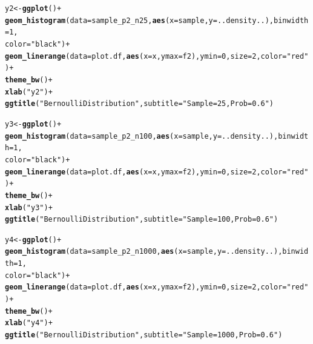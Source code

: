 \documentclass{article}\usepackage[]{graphicx}\usepackage[]{color}
\makeatletter
\newcommand{\hlnum}[1]{\textcolor[rgb]{0.686,0.059,0.569}{#1}}%
\newcommand{\hlstr}[1]{\textcolor[rgb]{0.192,0.494,0.8}{#1}}%
\newcommand{\hlopt}[1]{\textcolor[rgb]{0,0,0}{#1}}%
\newcommand{\hlstd}[1]{\textcolor[rgb]{0.345,0.345,0.345}{#1}}%
\newcommand{\hlkwb}[1]{\textcolor[rgb]{0.69,0.353,0.396}{#1}}%
\newcommand{\hlkwc}[1]{\textcolor[rgb]{0.333,0.667,0.333}{#1}}%
\newcommand{\hlkwd}[1]{\textcolor[rgb]{0.737,0.353,0.396}{\textbf{#1}}}%
\newenvironment{kframe}{%
 \def\at@end@of@kframe{}%
 \ifinner\ifhmode%
  \def\at@end@of@kframe{\end{minipage}}%
  \begin{minipage}{\columnwidth}%
 \fi\fi%
 \def\FrameCommand##1{\hskip\@totalleftmargin \hskip-\fboxsep
 \colorbox{shadecolor}{##1}\hskip-\fboxsep
     \hskip-\linewidth \hskip-\@totalleftmargin \hskip\columnwidth}%
 \MakeFramed {\advance\hsize-\width
   \@totalleftmargin\z@ \linewidth\hsize
   \@setminipage}}%
 {\par\unskip\endMakeFramed%
 \at@end@of@kframe}
\newenvironment{knitrout}{}{} %
\makeatother
\begin{document}
\begin{enumerate}
\begin{enumerate}
\begin{knitrout}
\begin{kframe}
\begin{alltt}
                \hlstd{y2}\hlkwb{<-}\hlkwd{ggplot}\hlstd{()}\hlopt{+}
          \hlkwd{geom_histogram}\hlstd{(}\hlkwc{data} \hlstd{= sample_p2_n25,} \hlkwd{aes}\hlstd{(}\hlkwc{x} \hlstd{= sample,} \hlkwc{y}\hlstd{=..density..),} \hlkwc{binwidth}\hlstd{=}\hlnum{1}\hlstd{,}
                         \hlkwc{color}\hlstd{=}\hlstr{"black"}\hlstd{)}\hlopt{+}
          \hlkwd{geom_linerange}\hlstd{(}\hlkwc{data}\hlstd{=plot.df,} \hlkwd{aes}\hlstd{(}\hlkwc{x}\hlstd{=x,} \hlkwc{ymax} \hlstd{= f2),} \hlkwc{ymin} \hlstd{=} \hlnum{0}\hlstd{,} \hlkwc{size}\hlstd{=}\hlnum{2}\hlstd{,} \hlkwc{color}\hlstd{=}\hlstr{"red"}\hlstd{)}\hlopt{+}
          \hlkwd{theme_bw}\hlstd{()} \hlopt{+}
          \hlkwd{xlab}\hlstd{(}\hlstr{"y2"}\hlstd{)}\hlopt{+}
          \hlkwd{ggtitle}\hlstd{(}\hlstr{"Bernoulli Distribution"}\hlstd{,}\hlkwc{subtitle} \hlstd{=} \hlstr{"Sample = 25, Prob =0.6"}\hlstd{)}

                \hlstd{y3}\hlkwb{<-}\hlkwd{ggplot}\hlstd{()}\hlopt{+}
          \hlkwd{geom_histogram}\hlstd{(}\hlkwc{data} \hlstd{= sample_p2_n100,} \hlkwd{aes}\hlstd{(}\hlkwc{x} \hlstd{= sample,} \hlkwc{y}\hlstd{=..density..),} \hlkwc{binwidth}\hlstd{=}\hlnum{1}\hlstd{,}
                         \hlkwc{color}\hlstd{=}\hlstr{"black"}\hlstd{)}\hlopt{+}
          \hlkwd{geom_linerange}\hlstd{(}\hlkwc{data}\hlstd{=plot.df,} \hlkwd{aes}\hlstd{(}\hlkwc{x}\hlstd{=x,} \hlkwc{ymax} \hlstd{= f2),} \hlkwc{ymin} \hlstd{=} \hlnum{0}\hlstd{,} \hlkwc{size}\hlstd{=}\hlnum{2}\hlstd{,} \hlkwc{color}\hlstd{=}\hlstr{"red"}\hlstd{)}\hlopt{+}
          \hlkwd{theme_bw}\hlstd{()} \hlopt{+}
          \hlkwd{xlab}\hlstd{(}\hlstr{"y3"}\hlstd{)}\hlopt{+}
          \hlkwd{ggtitle}\hlstd{(}\hlstr{"Bernoulli Distribution"}\hlstd{,}\hlkwc{subtitle} \hlstd{=} \hlstr{"Sample = 100, Prob =0.6"}\hlstd{)}

                \hlstd{y4}\hlkwb{<-}\hlkwd{ggplot}\hlstd{()}\hlopt{+}
          \hlkwd{geom_histogram}\hlstd{(}\hlkwc{data} \hlstd{= sample_p2_n1000,} \hlkwd{aes}\hlstd{(}\hlkwc{x} \hlstd{= sample,} \hlkwc{y}\hlstd{=..density..),} \hlkwc{binwidth}\hlstd{=}\hlnum{1}\hlstd{,}
                         \hlkwc{color}\hlstd{=}\hlstr{"black"}\hlstd{)}\hlopt{+}
          \hlkwd{geom_linerange}\hlstd{(}\hlkwc{data}\hlstd{=plot.df,} \hlkwd{aes}\hlstd{(}\hlkwc{x}\hlstd{=x,} \hlkwc{ymax} \hlstd{= f2),} \hlkwc{ymin} \hlstd{=} \hlnum{0}\hlstd{,} \hlkwc{size}\hlstd{=}\hlnum{2}\hlstd{,} \hlkwc{color}\hlstd{=}\hlstr{"red"}\hlstd{)}\hlopt{+}
          \hlkwd{theme_bw}\hlstd{()} \hlopt{+}
          \hlkwd{xlab}\hlstd{(}\hlstr{"y4"}\hlstd{)}\hlopt{+}
          \hlkwd{ggtitle}\hlstd{(}\hlstr{"Bernoulli Distribution"}\hlstd{,}\hlkwc{subtitle} \hlstd{=} \hlstr{"Sample = 1000, Prob =0.6"}\hlstd{)}


\end{alltt}
\end{kframe}
\end{knitrout}
\end{enumerate}
\end{enumerate}
\end{document}
